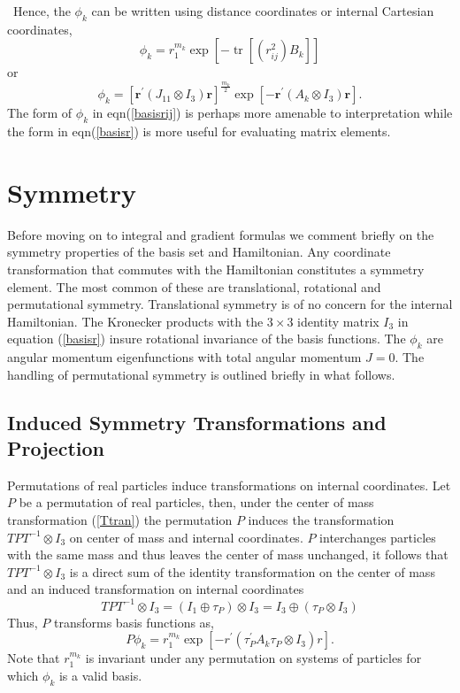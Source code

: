 \documentclass[12pt]{article}
\begin{document}
\ Hence, the $\phi_{k}$ can be written using distance coordinates or internal
Cartesian coordinates,
\begin{equation}
\phi_{k}=r_{1}^{m_{k}}\exp\left[  -\operatorname{tr}\left[  \left(  r_{ij}%
^{2}\right)  B_{k}\right]  \right] \label{basisrij}%
\end{equation}
or
\begin{equation}
\phi_{k}=\left[  \mathbf{r}^{\prime}(J_{11}\otimes I_{3})\mathbf{r}\right]
^{\frac{m_{k}}{2}}\exp\left[  -\mathbf{r}^{\prime}(A_{k}\otimes I_{3}%
)\mathbf{r}\right]  .\label{basisr}%
\end{equation}
The form of $\phi_{k}$ in eqn(\ref{basisrij}) is perhaps more amenable to
interpretation while the form in eqn(\ref{basisr}) is more useful for
evaluating matrix elements.

\section{Symmetry}

Before moving on to integral and gradient formulas we comment briefly on the
symmetry properties of the basis set and Hamiltonian. Any coordinate
transformation that commutes with the Hamiltonian constitutes a symmetry
element. The most common of these are translational, rotational and
permutational symmetry. Translational symmetry is of no concern for the
internal Hamiltonian. The Kronecker products with the $3\times3$ identity
matrix $I_{3}$ in equation (\ref{basisr}) insure rotational invariance of the
basis functions. The $\phi_{k}$ are angular momentum eigenfunctions with total
angular momentum $J=0$. The handling of permutational symmetry is outlined
briefly in what follows.

\subsection{\bigskip Induced Symmetry Transformations and Projection}

Permutations of real particles induce transformations on internal coordinates.
Let $P$ be a permutation of real particles, then, under the center of mass
transformation (\ref{Ttran}) the permutation $P$ induces the transformation
$TPT^{-1}\otimes I_{3}$ on center of mass and internal coordinates. $P$
interchanges particles with the same mass and thus leaves the center of mass
unchanged, it follows that $TPT^{-1}\otimes I_{3}$ is a direct sum of the
identity transformation on the center of mass and an induced transformation on
internal coordinates
\begin{equation}
TPT^{-1}\otimes I_{3}=\left(  I_{1}\oplus\tau_{P}\right)  \otimes I_{3}%
=I_{3}\oplus\left(  \tau_{P}\otimes I_{3}\right) \label{TPT}%
\end{equation}
Thus, $P$ transforms basis functions as,
\begin{equation}
P\phi_{k}=r_{1}^{m_{k}}\exp\left[  -r^{\prime}\left(  \tau_{P}^{\prime}%
A_{k}\tau_{P}\otimes I_{3}\right)  r\right]  .
\end{equation}
Note that $r_{1}^{m_{k}}$ is invariant under any permutation on systems of
particles for which $\phi_{k}$ is a valid basis.
\end{document}
